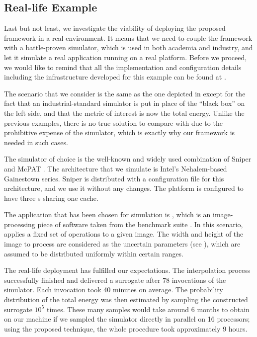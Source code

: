 \subsection{Real-life Example}

Last but not least, we investigate the viability of deploying the proposed
framework in a real environment. It means that we need to couple the framework
with a battle-proven simulator, which is used in both academia and industry, and
let it simulate a real application running on a real platform. Before we
proceed, we would like to remind that all the implementation and configuration
details including the infrastructure developed for this example can be found at
\cite{sources}.

The scenario that we consider is the same as the one depicted in 
except for the fact that an industrial-standard simulator is put in place of the
``black box'' on the left side, and that the metric of interest \g is now the
total energy. Unlike the previous examples, there is no true solution to compare
with due to the prohibitive expense of the simulator, which is exactly why our
framework is needed in such cases.

The simulator of choice is the well-known and widely used combination of Sniper
\cite{carlson2011} and McPAT \cite{li2009}. The architecture that we simulate is
Intel's Nehalem-based Gainestown series. Sniper is distributed with a
configuration file for this architecture, and we use it without any changes. The
platform is configured to have three s sharing one  cache.

The application that has been chosen for simulation is , which is an
image-processing piece of software taken from the  benchmark suite
\cite{bienia2011}. In this scenario,  applies a fixed set of operations
to a given image. The width and height of the image to process are considered as
the uncertain parameters \vu (see ), which are assumed to be
distributed uniformly within certain ranges.

The real-life deployment has fulfilled our expectations. The interpolation
process successfully finished and delivered a surrogate after 78 invocations of
the simulator. Each invocation took 40 minutes on average. The probability
distribution of the total energy was then estimated by sampling the constructed
surrogate $10^5$ times. These many samples would take around 6 months to obtain
on our machine if we sampled the simulator directly in parallel on 16
processors; using the proposed technique, the whole procedure took approximately
9 hours.

